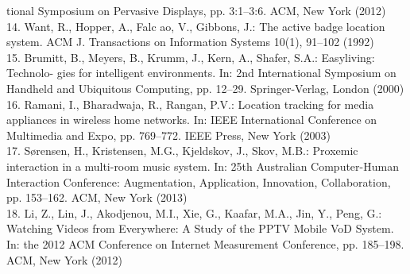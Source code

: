\documentclass[runningheads,a4paper]{llncs}
\begin{document}
\begin{thebibliography}{4}
tional Symposium on Pervasive Displays, pp. 3:1–3:6. ACM, New York (2012)\\
14. Want, R., Hopper, A., Falc ao, V., Gibbons, J.: The active badge location system.
ACM J. Transactions on Information Systems 10(1), 91–102 (1992)\\
15. Brumitt, B., Meyers, B., Krumm, J., Kern, A., Shafer, S.A.: Easyliving: Technolo-
gies for intelligent environments. In: 2nd International Symposium on Handheld and
Ubiquitous Computing, pp. 12–29. Springer-Verlag, London (2000)\\
16. Ramani, I., Bharadwaja, R., Rangan, P.V.: Location tracking for media appliances
in wireless home networks. In: IEEE International Conference on Multimedia and
Expo, pp. 769–772. IEEE Press, New York (2003)\\
17. Sørensen, H., Kristensen, M.G., Kjeldskov, J., Skov, M.B.: Proxemic interaction
in a multi-room music system. In: 25th Australian Computer-Human Interaction
Conference: Augmentation, Application, Innovation, Collaboration, pp. 153–162.
ACM, New York (2013)\\
18. Li, Z., Lin, J., Akodjenou, M.I., Xie, G., Kaafar, M.A., Jin, Y., Peng, G.: Watching
Videos from Everywhere: A Study of the PPTV Mobile VoD System. In: the 2012
ACM Conference on Internet Measurement Conference, pp. 185–198. ACM, New
York (2012)\\

\end{thebibliography}
\end{document}
